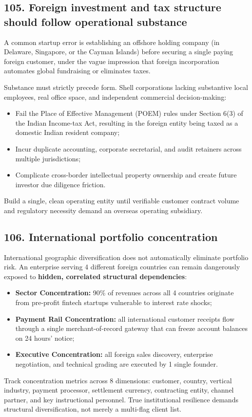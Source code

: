 \subsection{105. Foreign investment and tax structure should follow operational substance}

A common startup error is establishing an offshore holding company (in Delaware, Singapore, or the Cayman Islands) before securing a single paying foreign customer, under the vague impression that foreign incorporation automates global fundraising or eliminates taxes.

Substance must strictly precede form. Shell corporations lacking substantive local employees, real office space, and independent commercial decision-making:
\begin{itemize}
    \item Fail the Place of Effective Management (POEM) rules under Section 6(3) of the Indian Income-tax Act, resulting in the foreign entity being taxed as a domestic Indian resident company;
    \item Incur duplicate accounting, corporate secretarial, and audit retainers across multiple jurisdictions;
    \item Complicate cross-border intellectual property ownership and create future investor due diligence friction.
\end{itemize}
Build a single, clean operating entity until verifiable customer contract volume and regulatory necessity demand an overseas operating subsidiary.

\subsection{106. International portfolio concentration}

International geographic diversification does not automatically eliminate portfolio risk. An enterprise serving 4 different foreign countries can remain dangerously exposed to \textbf{hidden, correlated structural dependencies}:
\begin{itemize}
    \item \textbf{Sector Concentration:} 90\% of revenues across all 4 countries originate from pre-profit fintech startups vulnerable to interest rate shocks;
    \item \textbf{Payment Rail Concentration:} all international customer receipts flow through a single merchant-of-record gateway that can freeze account balances on 24 hours' notice;
    \item \textbf{Executive Concentration:} all foreign sales discovery, enterprise negotiation, and technical grading are executed by 1 single founder.
\end{itemize}
Track concentration metrics across 8 dimensions: customer, country, vertical industry, payment processor, settlement currency, contracting entity, channel partner, and key instructional personnel. True institutional resilience demands structural diversification, not merely a multi-flag client list.

